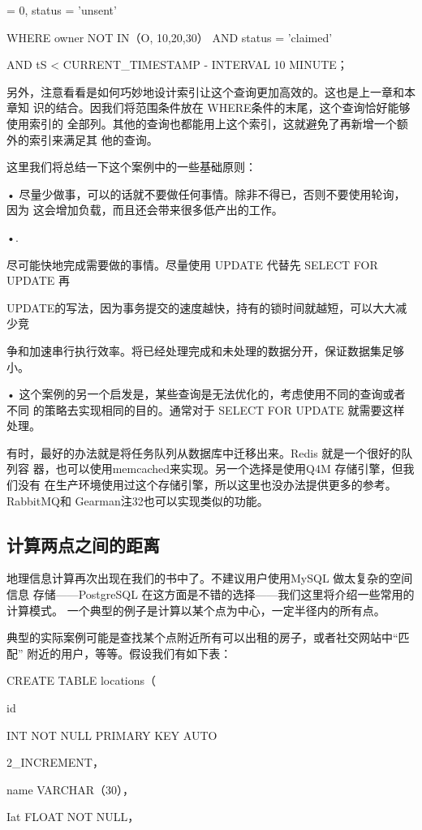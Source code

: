 = 0, status = 'unsent'

WHERE owner NOT IN（O, 10,20,30） AND status = 'claimed'

AND tS < CURRENT\_TIMESTAMP - INTERVAL 10 MINUTE；

另外，注意看看是如何巧妙地设计索引让这个查询更加高效的。这也是上一章和本章知
识的结合。因我们将范围条件放在 WHERE条件的末尾，这个查询恰好能够使用索引的
全部列。其他的查询也都能用上这个索引，这就避免了再新增一个额外的索引来满足其
他的查询。

这里我们将总结一下这个案例中的一些基础原则：

• 尽量少做事，可以的话就不要做任何事情。除非不得已，否则不要使用轮询，因为
这会增加负载，而且还会带来很多低产出的工作。

•.

尽可能快地完成需要做的事情。尽量使用 UPDATE 代替先 SELECT FOR UPDATE 再

UPDATE的写法，因为事务提交的速度越快，持有的锁时间就越短，可以大大减少竞

争和加速串行执行效率。将已经处理完成和未处理的数据分开，保证数据集足够小。

• 这个案例的另一个启发是，某些查询是无法优化的，考虑使用不同的查询或者不同
的策略去实现相同的目的。通常对于 SELECT FOR UPDATE 就需要这样处理。

有时，最好的办法就是将任务队列从数据库中迁移出来。Redis 就是一个很好的队列容
器，也可以使用memcached来实现。另一个选择是使用Q4M 存储引擎，但我们没有
在生产环境使用过这个存储引擎，所以这里也没办法提供更多的参考。RabbitMQ和
Gearman注32也可以实现类似的功能。

\subsection{计算两点之间的距离}
地理信息计算再次出现在我们的书中了。不建议用户使用MySQL 做太复杂的空间信息
存储——PostgreSQL 在这方面是不错的选择——我们这里将介绍一些常用的计算模式。
一个典型的例子是计算以某个点为中心，一定半径内的所有点。

典型的实际案例可能是查找某个点附近所有可以出租的房子，或者社交网站中“匹配”
附近的用户，等等。假设我们有如下表：

CREATE TABLE locations（

id

INT NOT NULL PRIMARY KEY AUTO

2\_INCREMENT，

name VARCHAR（30），

Iat FLOAT NOT NULL，

